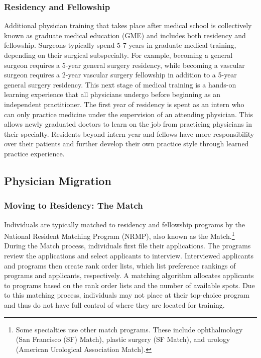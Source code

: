 \subsubsection{Residency and Fellowship}
Additional physician training that takes place after medical school is collectively known as graduate medical education (GME) and includes both residency and fellowship. Surgeons typically spend 5-7 years in graduate medical training, depending on their surgical subspecialty. For example, becoming a general surgeon requires a 5-year general surgery residency, while becoming a vascular surgeon requires a 2-year vascular surgery fellowship in addition to a 5-year general surgery residency. This next stage of medical training is a hands-on learning experience that all physicians undergo before beginning as an independent practitioner. The first year of residency is spent as an intern who can only practice medicine under the supervision of an attending physician. This allows newly graduated doctors to learn on the job from practicing physicians in their specialty. Residents beyond intern year and fellows have more responsibility over their patients and further develop their own practice style through learned practice experience. 

\subsection{Physician Migration}

\subsubsection{Moving to Residency: The Match}
Individuals are typically matched to residency and fellowship programs by the National Resident Matching Program (NRMP), also known as the Match.\footnote{Some specialties use other match programs. These include ophthalmology (San Francisco (SF) Match), plastic surgery (SF Match), and urology (American Urological Association Match).} During the Match process, individuals first file their applications. The programs review the applications and select applicants to interview. Interviewed applicants and programs then create rank order lists, which list preference rankings of programs and applicants, respectively. A matching algorithm allocates applicants to programs based on the rank order lists and the number of available spots. Due to this matching process, individuals may not place at their top-choice program and thus do not have full control of where they are located for training.


